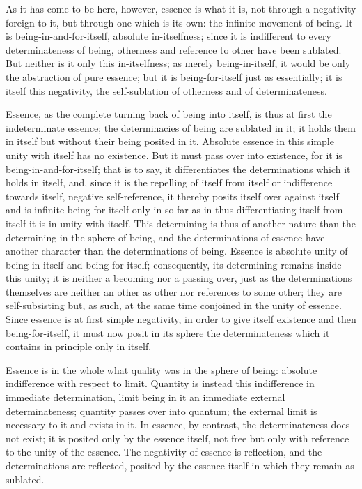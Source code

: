 As it has come to be here, however,
essence is what it is,
not through a negativity foreign to it,
but through one which is its own:
the infinite movement of being.
It is being-in-and-for-itself,
absolute in-itselfness;
since it is indifferent to
every determinateness of being,
otherness and reference to other have been sublated.
But neither is it only this in-itselfness;
as merely being-in-itself, it would be only
the abstraction of pure essence;
but it is being-for-itself just as essentially;
it is itself this negativity,
the self-sublation of otherness
and of determinateness.

Essence, as the complete turning back of being into itself,
is thus at first the indeterminate essence;
the determinacies of being are sublated in it;
it holds them in itself but without their being posited in it.
Absolute essence in this simple unity with itself has no existence.
But it must pass over into existence,
for it is being-in-and-for-itself;
that is to say, it differentiates
the determinations which it holds in itself,
and, since it is the repelling of itself from itself
or indifference towards itself, negative self-reference,
it thereby posits itself over against itself
and is infinite being-for-itself
only in so far as in thus
differentiating itself from itself
it is in unity with itself.
This determining is thus of another nature than
the determining in the sphere of being,
and the determinations of essence have another character
than the determinations of being.
Essence is absolute unity of being-in-itself and being-for-itself;
consequently, its determining remains inside this unity;
it is neither a becoming nor a passing over,
just as the determinations themselves are
neither an other as other nor references to some other;
they are self-subsisting but, as such,
at the same time conjoined in the unity of essence.
Since essence is at first simple negativity,
in order to give itself existence and then being-for-itself,
it must now posit in its sphere the determinateness
which it contains in principle only in itself.

Essence is in the whole what quality was in the sphere of being:
absolute indifference with respect to limit.
Quantity is instead this indifference in immediate determination,
limit being in it an immediate external determinateness;
quantity passes over into quantum;
the external limit is necessary to it and exists in it.
In essence, by contrast, the determinateness does not exist;
it is posited only by the essence itself,
not free but only with reference to
the unity of the essence.
The negativity of essence is reflection,
and the determinations are reflected,
posited by the essence itself
in which they remain as sublated.

